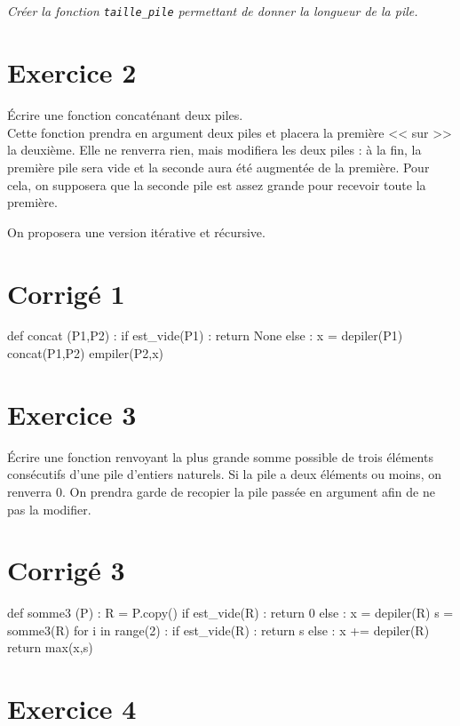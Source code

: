 \subparagraph{}\textit{Créer la fonction \texttt{taille\_pile} permettant de donner la longueur de la pile.}




\section*{Exercice 2}

Écrire une fonction concaténant deux piles. \\
Cette fonction prendra en argument deux piles et placera la première << sur >> la deuxième. Elle ne renverra rien, mais 
modifiera les deux piles : à la fin, la première pile sera vide et la seconde aura été augmentée de la première. Pour 
cela, on supposera que la seconde pile est assez grande pour recevoir toute la première.

On proposera une version itérative et récursive.
\ifprof
\section*{Corrigé 1}
\begin{python}
def concat (P1,P2) :
    if est_vide(P1) :
	return None
    else :
	x = depiler(P1)
	concat(P1,P2)
	empiler(P2,x)
\end{python} 
\else
\fi

\section*{Exercice 3}

Écrire une fonction renvoyant la plus grande somme possible de trois éléments consécutifs d'une pile d'entiers 
naturels. Si la pile a deux éléments ou moins, on renverra 0. On prendra garde de recopier la pile passée en argument 
afin de ne pas la modifier.

\ifprof
\section*{Corrigé 3}

\begin{python}
def somme3 (P) :
    R = P.copy()
    if est_vide(R) :
	return 0
    else :
	x = depiler(R)
	s = somme3(R)
	for i in range(2) :
	if est_vide(R) :
	    return s
	else :
	    x += depiler(R)
	return max(x,s)
	    
\end{python} 


\else \fi
\section*{Exercice 4}

